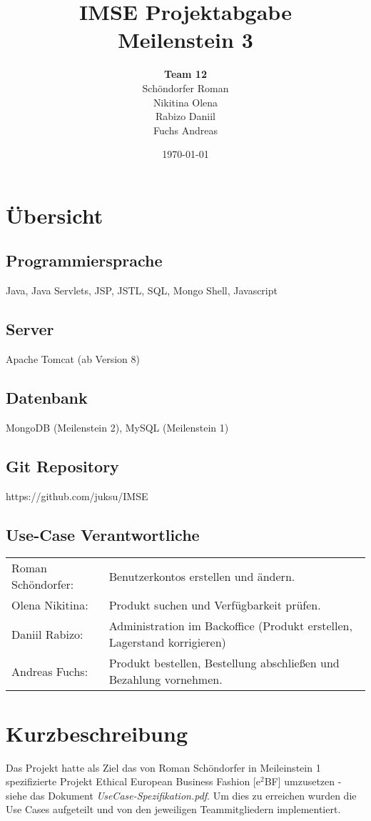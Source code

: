 \documentclass[a4paper]{article}
\title{\textbf{IMSE Projektabgabe}\\ Meilenstein 3}
\author{\textbf{Team 12} \\ Schöndorfer Roman \\ Nikitina Olena \\ Rabizo Daniil \\ Fuchs Andreas}
\date{\today}
\begin{document}
\maketitle


\section*{Übersicht}
\subsection*{Programmiersprache} Java, Java Servlets, JSP, JSTL, SQL, Mongo Shell, Javascript

\subsection*{Server} Apache Tomcat (ab Version 8)

\subsection*{Datenbank} MongoDB (Meilenstein 2), MySQL (Meilenstein 1)

\subsection*{Git Repository} https://github.com/juksu/IMSE

\subsection*{Use-Case Verantwortliche}
\renewcommand{\arraystretch}{1.3}
\begin{tabular}{lp{8cm}}
	Roman Schöndorfer: 	& Benutzerkontos erstellen und ändern.\\
	Olena Nikitina:		& Produkt suchen und Verfügbarkeit prüfen.\\
	Daniil Rabizo: 		& Administration im Backoffice (Produkt erstellen, Lagerstand korrigieren)\\
	Andreas Fuchs: 		& Produkt bestellen, Bestellung abschließen und Bezahlung vornehmen.\\
\end{tabular}


\section*{Kurzbeschreibung}
Das Projekt hatte als Ziel das von Roman Schöndorfer in Meileinstein 1 spezifizierte Projekt Ethical European Business Fashion [e\(^2\)BF] umzusetzen - siehe das Dokument \emph{UseCase-Spezifikation.pdf}. Um dies zu erreichen wurden die Use Cases aufgeteilt und von den jeweiligen Teammitgliedern implementiert.
\end{document}
